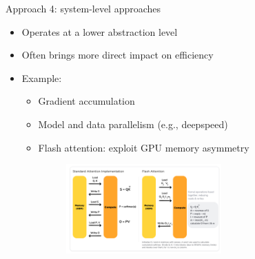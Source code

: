 \documentclass[usenames,dvipsnames,notes,11pt,aspectratio=169,hyperref={colorlinks=true, linkcolor=blue}]{beamer}
\begin{document}
\begin{frame}
    {Approach 4: system-level approaches}
    \begin{itemize}
        \item Operates at a lower abstraction level
        \item Often brings more direct impact on efficiency
        \item Example:
            \begin{itemize}
                \item Gradient accumulation
                \item Model and data parallelism (e.g., deepspeed)
                \item Flash attention: exploit GPU memory asymmetry
                    \begin{figure}
    \includegraphics[width=0.6\textwidth]{figures/flash-attention}\\
                    \end{figure}
            \end{itemize}
    \end{itemize}
\end{frame}
\end{document}
